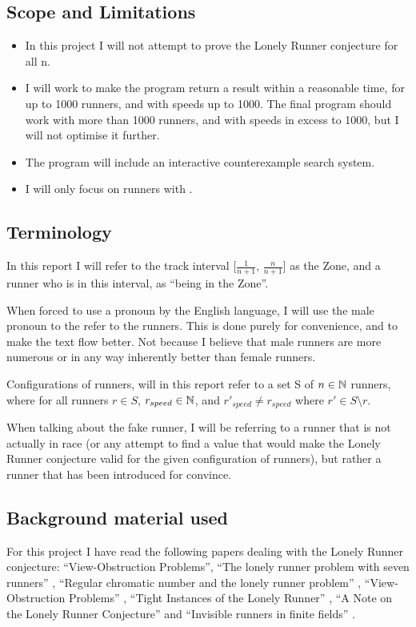 \subsection{Scope and Limitations}
\label{scope}
\begin{itemize}
\item In this project I will not attempt to prove the Lonely Runner conjecture for all n. 
\item I will work to make the program return a result within a reasonable time, for up to 1000 runners, and with speeds up to 1000. The final program should work with more than 1000 runners, and with speeds in excess to 1000, but I will not optimise it further. \item The program will include an interactive counterexample search system.
\item I will only focus on runners with .
\end{itemize}

\subsection{Terminology}
\label{Termonolgy}
In this report I will refer to the track interval [$\frac{1}{n + 1}$, $\frac{n}{n+1}$] as the Zone, and a runner who is in this interval, as ``being in the Zone''.

When forced to use a pronoun by the English language, I will use the male pronoun to the refer to the runners. This is done purely for convenience, and to make the text flow better. Not because I believe that male runners are more numerous or in any way inherently better than female runners.

Configurations of runners, will in this report refer to a set S of $n \in \mathbb{N}$ runners, where for all runners $r \in S$, $r_{speed} \in \mathbb{N}$, and $r\prime_{speed} \neq r_{speed}$ where $r\prime \in S \setminus r$.

When talking about the fake runner, I will be referring to a runner that is not actually in race (or any attempt to find a value that would make the Lonely Runner conjecture valid for the given configuration of runners), but rather a runner that has been introduced for convince.   

\subsection{Background material used}
\label{background}
For this project I have read the following papers dealing with the Lonely Runner conjecture: ``View-Obstruction Problems''\cite{Bienia97flows.view-obstructions}, ``The lonely runner problem with seven runners'' \cite{serra_thelonely}, ``Regular chromatic number and the lonely runner problem'' \cite{Barajas2007479}, ``View-Obstruction Problems'' \cite{springerlink:10.1007/BF01832623}, ``Tight Instances of the Lonely Runner'' \cite{Goddyn96tightinstances}, ``A Note on the Lonely Runner Conjecture'' \cite{ANote} and ``Invisible runners in finite fields'' \cite{invis}.

